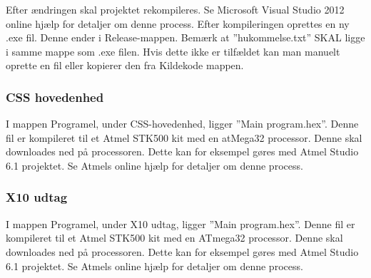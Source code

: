Efter ændringen skal projektet rekompileres. Se Microsoft Visual Studio 2012 online hjælp for detaljer om denne process. Efter kompileringen oprettes en ny .exe fil. Denne ender i Release-mappen. Bemærk at ''hukommelse.txt'' SKAL ligge i samme mappe som .exe filen. Hvis dette ikke er tilfældet kan man manuelt oprette en fil eller kopierer den fra Kildekode mappen.

\subsubsection{CSS hovedenhed}
I mappen Programel, under CSS-hovedenhed, ligger ''Main program.hex''. Denne fil er kompileret til et Atmel STK500 kit med en atMega32 processor. Denne skal downloades ned på processoren. Dette kan for eksempel gøres med Atmel Studio 6.1 projektet. Se Atmels online hjælp for detaljer om denne process.

\subsubsection{X10 udtag}
I mappen Programel, under X10 udtag, ligger ''Main program.hex''. Denne fil er kompileret til et Atmel STK500 kit med en ATmega32 processor. Denne skal downloades ned på processoren. Dette kan for eksempel gøres med Atmel Studio 6.1 projektet. Se Atmels online hjælp for detaljer om denne process.